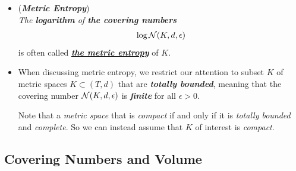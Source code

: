 \documentclass[11pt]{article}
\begin{document}
\begin{itemize}
\begin{proof}
To prove the lower bound, choose an $2\epsilon$-separated subset $\cP = \set{x_i}_i$ in $K$ and an $\epsilon$-net $\cN = \set{y_j}_j$ of $K$. By the definition of a net, each point $x_i$ belongs \emph{a closed $\epsilon$-ball centered at some point $y_j$}. Moreover, since any closed $\epsilon$-ball can not contain a pair of $2\epsilon$-separated points, \emph{each $\epsilon$-ball centered at $y_j$ may contain \textbf{at most one point} $x_i$}. The \emph{\textbf{pigeonhole principle}} then yields 
\begin{align*}
\abs{\cP} \le \abs{\cN}.
\end{align*}  Since this happens for arbitrary packing $\cP$ and covering $\cN$, the lower bound in the lemma is proved. \qed
\end{proof}

\item \begin{definition} (\textbf{\emph{Metric Entropy}}) \\
\emph{The \textbf{logarithm} of \textbf{the covering numbers}} 
\begin{align*}
\log {\mathcal N}(K, d, \epsilon)
\end{align*}  is often called \underline{\emph{\textbf{the metric entropy}}} of $K$.
\end{definition}

\item \begin{remark}
When discussing metric entropy, we restrict our attention to subset $K$ of metric spaces $K \subset (T, d)$ that are \emph{\textbf{totally bounded}}, meaning that the covering number ${\mathcal N}(K, d, \epsilon)$ is \emph{\textbf{finite}} for all $\epsilon > 0$. 

Note that  a \emph{metric space} that is \emph{compact} if and only if it is  \emph{totally bounded} and \emph{complete}. So we can instead assume that $K$ of interest is \emph{compact}.
\end{remark}
\end{itemize}
\subsection{Covering Numbers and Volume}
\end{document}
